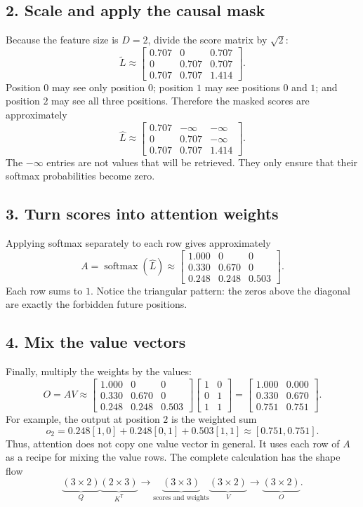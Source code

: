 \documentclass[11pt]{article}
\begin{document}
\subsection{2. Scale and apply the causal mask}
Because the feature size is $D=2$, divide the score matrix by $\sqrt{2}$:
\[
\widetilde L\approx
\begin{bmatrix}
0.707&0&0.707\\
0&0.707&0.707\\
0.707&0.707&1.414
\end{bmatrix}.
\]
Position $0$ may see only position $0$; position $1$ may see positions $0$ and
$1$; and position $2$ may see all three positions. Therefore the masked scores
are approximately
\[
\widehat L\approx
\begin{bmatrix}
0.707&-\infty&-\infty\\
0&0.707&-\infty\\
0.707&0.707&1.414
\end{bmatrix}.
\]
The $-\infty$ entries are not values that will be retrieved. They only ensure
that their softmax probabilities become zero.

\subsection{3. Turn scores into attention weights}
Applying softmax separately to each row gives approximately
\[
A=\operatorname{softmax}(\widehat L)\approx
\begin{bmatrix}
1.000&0&0\\
0.330&0.670&0\\
0.248&0.248&0.503
\end{bmatrix}.
\]
Each row sums to $1$. Notice the triangular pattern: the zeros above the
diagonal are exactly the forbidden future positions.

\subsection{4. Mix the value vectors}
Finally, multiply the weights by the values:
\[
O=AV\approx
\begin{bmatrix}
1.000&0&0\\
0.330&0.670&0\\
0.248&0.248&0.503
\end{bmatrix}
\begin{bmatrix}
1&0\\
0&1\\
1&1
\end{bmatrix}
=
\begin{bmatrix}
1.000&0.000\\
0.330&0.670\\
0.751&0.751
\end{bmatrix}.
\]
For example, the output at position $2$ is the weighted sum
\[
o_2=0.248[1,0]+0.248[0,1]+0.503[1,1]
\approx[0.751,0.751].
\]
Thus, attention does not copy one value vector in general. It uses each row of
$A$ as a recipe for mixing the value rows. The complete calculation has the
shape flow
\[
\underbrace{(3\times2)}_{Q}
\underbrace{(2\times3)}_{K^\mathsf{T}}
\to\underbrace{(3\times3)}_{\text{scores and weights}}
\underbrace{(3\times2)}_{V}
\to\underbrace{(3\times2)}_{O}.
\]
\end{document}
